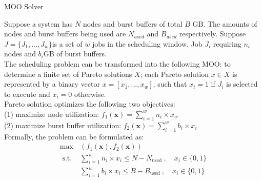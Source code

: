 \documentclass[aspectratio=1610]{beamer}
\begin{document}
\begin{frame}{MOO Solver}

    Suppose a system has $N$ nodes and burst buffers of total $B$ GB. 
    The amounts of nodes and burst buffers being used are $N_{used}$ and $B_{used}$ respectively.
    Suppose $J = \{J_1 , . . . , J_w \} $is a set of $w$ jobs in the scheduling window. 
    Job $J_i$ requiring $n_i$ nodes and $b_i $GB of burst buffers. \\
    \vspace{10pt}
    The scheduling problem can be transformed into the following MOO: 
    to determine a finite set of Pareto solutions $X$; 
    each Pareto solution $x \in X$ is represented by a binary vector $x = [x_1 , . . . ,x_w ]$, 
    such that $x_i = 1$ if $J_i$ is selected to execute and $x_i = 0$ otherwise. \\
    \vspace{10pt}
    Pareto solution optimizes the following two objectives: \\
    (1) maximize node utilization:  $f_{1}(\boldsymbol{x})=\sum_{i=1}^{w} n_{i} \times x_{w}$ \\
    (2) maximize burst buffer utilization:  $f_{2}(\boldsymbol{x})=\sum_{i=1}^{w} b_{i} \times x_{i}$ \\  
    Formally, the problem can be formulated as:
    $$
    \begin{array}{ll}
    \max & \left(f_{1}(\boldsymbol{x}), f_{2}(\boldsymbol{x})\right) \\
    \text { s.t. } & \sum_{i=1}^{w} n_{i} \times x_{i} \leq N-N_{\text {used }}, \quad x_{i} \in\{0,1\} \\
    & \sum_{i=1}^{w} b_{i} \times x_{i} \leq B-B_{\text {used }}, \quad x_{i} \in\{0,1\}
    \end{array}
    $$

\end{frame}
\end{document}
